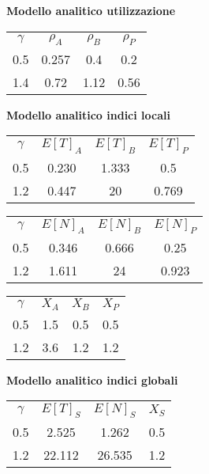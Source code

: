 \textbf{Modello analitico utilizzazione}\\
\begin{table}[!htbp]
    \centering
    \begin{tabular}{cccc}
        $\gamma$ & $\rho_{A}$ & $\rho_{B}$ & $\rho_{P}$ \\         
        0.5 & 0.257 & 0.4 & 0.2 \\
        1.4 & 0.72 & 1.12 & 0.56 \\
    \end{tabular}
    \label{tab:rho_values_last}
\end{table}

\textbf{Modello analitico indici locali}\\

\begin{table}[!htbp]
    \centering
    \begin{tabular}{cccc}
        $\gamma$ & $E[T]_{A}$ & $E[T]_{B}$ & $E[T]_{P}$ \\         
        0.5 & 0.230 & 1.333 & 0.5 \\
        1.2 & 0.447 & 20 & 0.769 \\
    \end{tabular}
    \label{tab:et_values_new}
\end{table}
\begin{table}[!htbp]
    \centering
    \begin{tabular}{cccc}
        $\gamma$ & $E[N]_{A}$ & $E[N]_{B}$ & $E[N]_{P}$ \\         
        0.5 & 0.346 & 0.666 & 0.25 \\
        1.2 & 1.611 & 24 & 0.923 \\
    \end{tabular}
    \label{tab:en_values_new}
\end{table}
\begin{table}[!htbp]
    \centering
    \begin{tabular}{cccc}
        $\gamma$ & $X_{A}$ & $X_{B}$ & $X_{P}$ \\         
        0.5 & 1.5 & 0.5 & 0.5 \\
        1.2 & 3.6 & 1.2 & 1.2 \\
    \end{tabular}
    \label{tab:x_values_new}
\end{table}

\textbf{Modello analitico indici globali}\\

\begin{table}[!htbp]
    \centering
    \begin{tabular}{cccc}
        $\gamma$ & $E[T]_{S}$ & $E[N]_{S}$ & $X_{S}$ \\         
        0.5 & 2.525 & 1.262 & 0.5 \\
        1.2 & 22.112 & 26.535 & 1.2 \\
    \end{tabular}
    \label{tab:et_en_x_values}
\end{table}